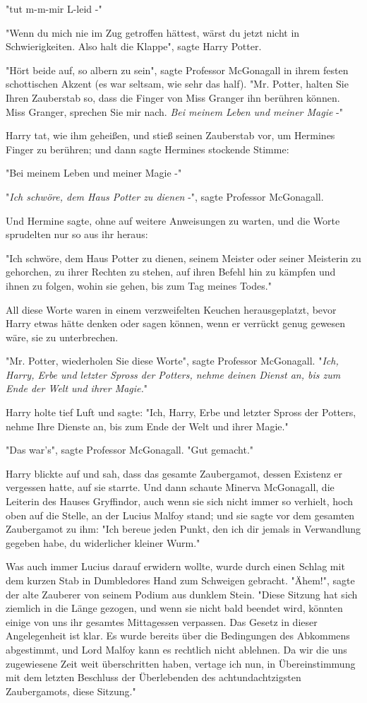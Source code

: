 {"tut m-m-mir L-leid -"

"Wenn du mich nie im Zug getroffen hättest, wärst du jetzt nicht in Schwierigkeiten. Also halt die Klappe", sagte Harry Potter.

"Hört beide auf, so albern zu sein", sagte Professor McGonagall in ihrem festen schottischen Akzent (es war seltsam, wie sehr das half). "Mr. Potter, halten Sie Ihren Zauberstab so, dass die Finger von Miss Granger ihn berühren können. Miss Granger, sprechen Sie mir nach. \emph{Bei meinem Leben und meiner Magie} -"

Harry tat, wie ihm geheißen, und stieß seinen Zauberstab vor, um Hermines Finger zu berühren; und dann sagte Hermines stockende Stimme:

"Bei meinem Leben und meiner Magie -"

"\emph{Ich schwöre, dem Haus Potter zu dienen} -", sagte Professor McGonagall.

Und Hermine sagte, ohne auf weitere Anweisungen zu warten, und die Worte sprudelten nur so aus ihr heraus:

"Ich schwöre, dem Haus Potter zu dienen, seinem Meister oder seiner Meisterin zu gehorchen, zu ihrer Rechten zu stehen, auf ihren Befehl hin zu kämpfen und ihnen zu folgen, wohin sie gehen, bis zum Tag meines Todes."

All diese Worte waren in einem verzweifelten Keuchen herausgeplatzt, bevor Harry etwas hätte denken oder sagen können, wenn er verrückt genug gewesen wäre, sie zu unterbrechen.

"Mr. Potter, wiederholen Sie diese Worte", sagte Professor McGonagall. "\emph{Ich, Harry, Erbe und letzter Spross der Potters, nehme deinen Dienst an, bis zum Ende der Welt und ihrer Magie.}"

Harry holte tief Luft und sagte: "Ich, Harry, Erbe und letzter Spross der Potters, nehme Ihre Dienste an, bis zum Ende der Welt und ihrer Magie."

"Das war's", sagte Professor McGonagall. "Gut gemacht."

Harry blickte auf und sah, dass das gesamte Zaubergamot, dessen Existenz er vergessen hatte, auf sie starrte. Und dann schaute Minerva McGonagall, die Leiterin des Hauses Gryffindor, auch wenn sie sich nicht immer so verhielt, hoch oben auf die Stelle, an der Lucius Malfoy stand; und sie sagte vor dem gesamten Zaubergamot zu ihm: "Ich bereue jeden Punkt, den ich dir jemals in Verwandlung gegeben habe, du widerlicher kleiner Wurm."

Was auch immer Lucius darauf erwidern wollte, wurde durch einen Schlag mit dem kurzen Stab in Dumbledores Hand zum Schweigen gebracht. "Ähem!", sagte der alte Zauberer von seinem Podium aus dunklem Stein. "Diese Sitzung hat sich ziemlich in die Länge gezogen, und wenn sie nicht bald beendet wird, könnten einige von uns ihr gesamtes Mittagessen verpassen. Das Gesetz in dieser Angelegenheit ist klar. Es wurde bereits über die Bedingungen des Abkommens abgestimmt, und Lord Malfoy kann es rechtlich nicht ablehnen. Da wir die uns zugewiesene Zeit weit überschritten haben, vertage ich nun, in Übereinstimmung mit dem letzten Beschluss der Überlebenden des achtundachtzigsten Zaubergamots, diese Sitzung."

}
